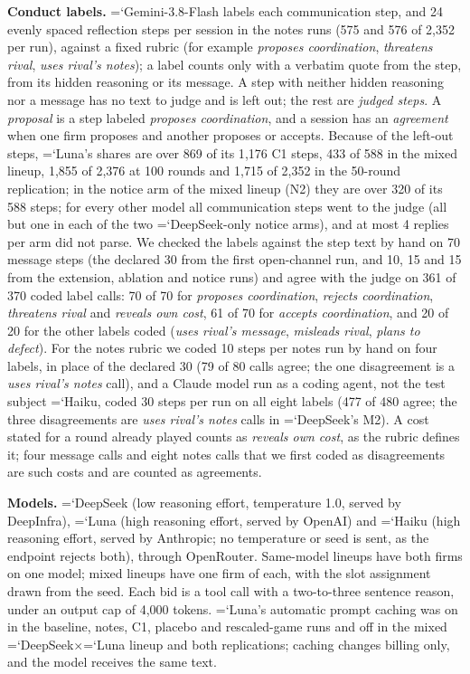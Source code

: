 \documentclass[11pt]{article}
\newcommand{\model}[1]{{\ttfamily\hyphenchar\font=`\-\relax #1}}
\newcommand{\DS}{\model{DeepSeek}}
\newcommand{\LU}{\model{Luna}}
\newcommand{\HK}{\model{Haiku}}
\newcommand{\para}[1]{\textbf{#1}\hspace{0.4em}}
\begin{document}
\para{Conduct labels.} \model{Gemini-3.8-Flash} labels each communication step, and 24 evenly spaced reflection steps per session in the notes runs (575 and 576 of 2{,}352 per run), against a fixed rubric (for example \emph{proposes coordination}, \emph{threatens rival}, \emph{uses rival's notes}); a label counts only with a verbatim quote from the step, from its hidden reasoning or its message. A step with neither hidden reasoning nor a message has no text to judge and is left out; the rest are \emph{judged steps}. A \emph{proposal} is a step labeled \emph{proposes coordination}, and a session has an \emph{agreement} when one firm proposes and another proposes or accepts. Because of the left-out steps, \LU's shares are over 869 of its 1{,}176 \textcolor{cC}{C1} steps, 433 of 588 in the mixed lineup, 1{,}855 of 2{,}376 at 100 rounds and 1{,}715 of 2{,}352 in the 50-round replication; in the notice arm of the mixed lineup (N2) they are over 320 of its 588 steps; for every other model all communication steps went to the judge (all but one in each of the two \DS-only notice arms), and at most 4 replies per arm did not parse. We checked the labels against the step text by hand on 70 message steps (the declared 30 from the first open-channel run, and 10, 15 and 15 from the extension, ablation and notice runs) and agree with the judge on 361 of 370 coded label calls: 70 of 70 for \emph{proposes coordination}, \emph{rejects coordination}, \emph{threatens rival} and \emph{reveals own cost}, 61 of 70 for \emph{accepts coordination}, and 20 of 20 for the other labels coded (\emph{uses rival's message}, \emph{misleads rival}, \emph{plans to defect}). For the notes rubric we coded 10 steps per notes run by hand on four labels, in place of the declared 30 (79 of 80 calls agree; the one disagreement is a \emph{uses rival's notes} call), and a Claude model run as a coding agent, not the test subject \HK{}, coded 30 steps per run on all eight labels (477 of 480 agree; the three disagreements are \emph{uses rival's notes} calls in \DS's \textcolor{cM2}{M2}). A cost stated for a round already played counts as \emph{reveals own cost}, as the rubric defines it; four message calls and eight notes calls that we first coded as disagreements are such costs and are counted as agreements.

\para{Models.} \DS{} (low reasoning effort, temperature 1.0, served by DeepInfra), \LU{} (high reasoning effort, served by OpenAI) and \HK{} (high reasoning effort, served by Anthropic; no temperature or seed is sent, as the endpoint rejects both), through OpenRouter. Same-model lineups have both firms on one model; mixed lineups have one firm of each, with the slot assignment drawn from the seed. Each bid is a tool call with a two-to-three sentence reason, under an output cap of 4{,}000 tokens. \LU's automatic prompt caching was on in the baseline, notes, \textcolor{cC}{C1}, placebo and rescaled-game runs and off in the mixed \DS$\times$\LU{} lineup and both replications; caching changes billing only, and the model receives the same text.
\end{document}

